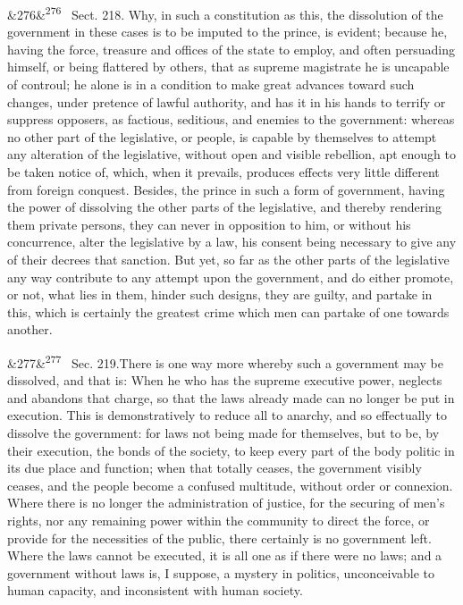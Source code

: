 \documentclass[12pt]{article}
\newcommand{\para}[1][]{\par\noindent\ifx&#1&\else\textsuperscript{\footnotesize #1}~\fi}
\begin{document}
\para[276] Sect. 218. Why, in such a constitution as this, the dissolution of the government in these cases is to be imputed to the prince, is evident; because he, having the force, treasure and offices of the state to employ, and often persuading himself, or being flattered by others, that as supreme magistrate he is uncapable of controul; he alone is in a condition to make great advances toward such changes, under pretence of lawful authority, and has it in his hands to terrify or suppress opposers, as factious, seditious, and enemies to the government: whereas no other part of the legislative, or people, is capable by themselves to attempt any alteration of the legislative, without open and visible rebellion, apt enough to be taken notice of, which, when it prevails, produces effects very little different from foreign conquest. Besides, the prince in such a form of government, having the power of dissolving the other parts of the legislative, and thereby rendering them private persons, they can never in opposition to him, or without his concurrence, alter the legislative by a law, his consent being necessary to give any of their decrees that sanction. But yet, so far as the other parts of the legislative any way contribute to any attempt upon the government, and do either promote, or not, what lies in them, hinder such designs, they are guilty, and partake in this, which is certainly the greatest crime which men can partake of one towards another.

\para[277] Sec. 219.There is one way more whereby such a government may be dissolved, and that is: When he who has the supreme executive power, neglects and abandons that charge, so that the laws already made can no longer be put in execution. This is demonstratively to reduce all to anarchy, and so effectually to dissolve the government: for laws not being made for themselves, but to be, by their execution, the bonds of the society, to keep every part of the body politic in its due place and function; when that totally ceases, the government visibly ceases, and the people become a confused multitude, without order or connexion. Where there is no longer the administration of justice, for the securing of men's rights, nor any remaining power within the community to direct the force, or provide for the necessities of the public, there certainly is no government left. Where the laws cannot be executed, it is all one as if there were no laws; and a government without laws is, I suppose, a mystery in politics, unconceivable to human capacity, and inconsistent with human society.
\end{document}
